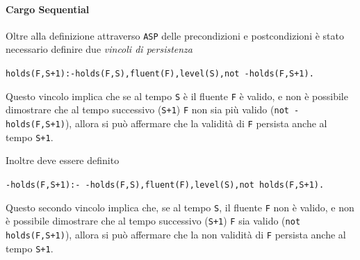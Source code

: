 \documentclass[a4paper,oneside,12pt]{book}
\begin{document}
    \paragraph*{Cargo Sequential\\}
    Oltre alla definizione attraverso \texttt{ASP} delle precondizioni e postcondizioni è stato necessario
    definire due \textit{vincoli di persistenza}
    \begin{center}
        \texttt{holds(F,S+1):-holds(F,S),fluent(F),level(S),not -holds(F,S+1).}
    \end{center}
    Questo vincolo implica che se al tempo	\texttt{S} è il fluente \texttt{F} è valido, e non è possibile
    dimostrare che al tempo successivo (\texttt{S+1}) \texttt{F} non sia più valido
    (\texttt{not -holds(F,S+1)}), allora si può affermare che la validità di \texttt{F} persista anche
    al tempo \texttt{S+1}.

    Inoltre deve essere definito
    \begin{center}
        \texttt{-holds(F,S+1):- -holds(F,S),fluent(F),level(S),not holds(F,S+1).}
    \end{center}
    Questo secondo vincolo implica che, se al tempo	\texttt{S}, il fluente \texttt{F} non è valido,
    e non è possibile dimostrare che al tempo successivo (\texttt{S+1}) \texttt{F} sia valido
    (\texttt{not holds(F,S+1)}), allora si può affermare che la non validità di \texttt{F}
    persista anche al tempo \texttt{S+1}.
\end{document}
